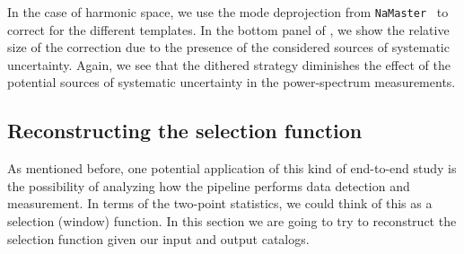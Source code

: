 \documentclass[twocolumn]{aastex62}
\begin{document}


In the case of harmonic space, we use the mode deprojection from \texttt{NaMaster}~\citep{Namaster} to correct for the different templates. In the bottom panel of , we show the relative size of the correction due to the presence of the considered sources of systematic uncertainty. Again, we see that the dithered strategy diminishes the effect of the potential sources of systematic uncertainty in the power-spectrum measurements.




\subsection{Reconstructing the selection function}
As mentioned before, one potential application of this kind of end-to-end study is the possibility of analyzing how the pipeline performs data detection and measurement. In terms of the two-point statistics, we could think of this as a selection (window) function. In this section we are going to try to reconstruct the selection function given our input and output catalogs.
\end{document}

